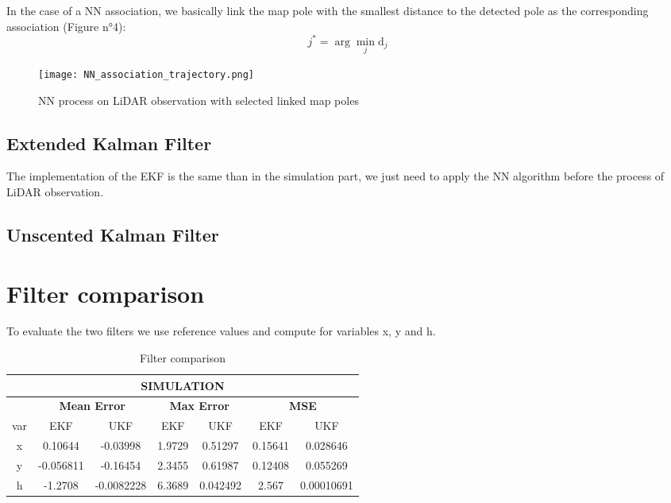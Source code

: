 \documentclass[conference]{IEEEtran}
\begin{document}
\vspace{2mm}

\noindent In the case of a NN association, we basically link the map pole with the smallest distance to the detected pole as the corresponding association (Figure n°4):
\[
j^* = \arg\min_j \text{d}_j
\]

\begin{figure}[H]
    \centering
    \texttt{[image: NN\_association\_trajectory.png]}
    \caption{NN process on LiDAR observation with selected linked map poles}
    \label{fig:enter-label}
\end{figure}


\subsection{Extended Kalman Filter}

The implementation of the EKF is the same than in the simulation part, we just need to apply the NN algorithm before the process of LiDAR observation.

\subsection{Unscented Kalman Filter}

\section{Filter comparison}

To evaluate the two filters we use reference values and compute for variables x, y and h. 

\begin{table}
\centering
\caption{Filter comparison}
\begin{tabular}{c|c|c|c|c|c|c} 
\multicolumn{7}{|c|}{\textbf{SIMULATION}}\\ \hline
 & \multicolumn{2}{|c|}{\textbf{Mean Error}} & \multicolumn{2}{|c|}{\textbf{Max Error}} & \multicolumn{2}{|c|}{\textbf{MSE}}\\ \hline
var & EKF & UKF & EKF & UKF & EKF & UKF \\ \hline
  x  & 0.10644 & -0.03998 & 1.9729 & 0.51297 & 0.15641 & 0.028646\\
  y   & -0.056811 & -0.16454 &  2.3455 & 0.61987 & 0.12408 & 0.055269 \\
  h   & -1.2708 & -0.0082228 &  6.3689 & 0.042492 & 2.567 & 0.00010691 \\
\end{tabular}

\end{table}
\end{document}
